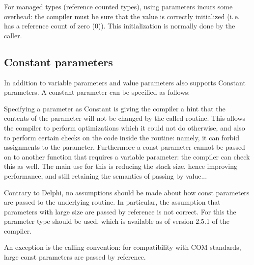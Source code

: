 \begin{remark}
For managed types (reference counted types), using  parameters incurs some overhead:
the compiler must be sure that the value is correctly initialized (i.\,e. has a reference count
of zero (0)). This initialization is normally done by the caller.
\end{remark}



%
\subsection{Constant parameters}
In addition to variable parameters and value parameters \fpc also supports
Constant parameters. A constant parameter can be specified as follows:

Specifying a parameter as Constant is giving the compiler a hint that the
contents of the parameter will not be changed by the called routine. This
allows the compiler to perform optimizations which it could not do otherwise,
and also to perform certain checks on the code inside the routine: namely,
it can forbid assignments to the parameter.
Furthermore a const parameter cannot be passed on to another
function that requires a variable parameter: the compiler can check this as
well.
The main use for this is reducing the stack size, hence improving
performance, and still retaining the semantics of passing by value...

\begin{remark}
Contrary to Delphi, no assumptions should be made about how const parameters
are passed to the underlying routine. In particular, the assumption that
parameters with large size are passed by reference is not correct. For this
the  parameter type should be used, which is available as of
version 2.5.1 of the compiler.

An exception is the  calling convention: for compatibility with
COM standards, large const parameters are passed by reference.
\end{remark}

